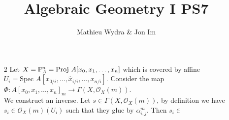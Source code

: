 \documentclass[10pt,a4paper]{article}
\title{Algebraic Geometry I PS7}
\author{Mathieu Wydra \& Jon Im}
\begin{document}
\maketitle
\begin{enumerate}
\item[2] Let $X = \mathbb{P}_A^n = \text{Proj } A[x_0,x_1,\ldots, x_n]$ which is covered by affine $U_i = \text{Spec } A[x_{0/i},\ldots,\hat{x}_{i/i},\ldots, x_{n/i}]$. Consider the map $\Phi: A[x_0,x_1,\ldots, x_n]_m\to \Gamma(X,\mathcal{O}_X(m))$.\\
We construct an inverse. Let $s\in \Gamma(X,\mathcal{O}_X(m))$, by definition we have $s_i\in \mathcal{O}_X(m)(U_i)$ such that they glue by $\alpha_{i,j}^m$. Then $s_i\in $
\end{enumerate}
\end{document}
